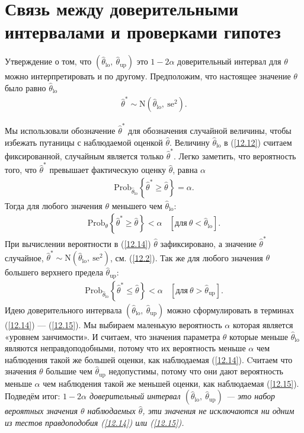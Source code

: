 \section{Связь между доверительными интервалами и проверками гипотез}
Утверждение о том, что $(\widehat{\theta}_{\text{lo}},\  \widehat{\theta}_{\text{up}})$ это $1 - 2 \alpha$ доверительный интервал для $\theta$ можно интерпретировать и по другому. Предположим, что настоящее значение $\theta$ было равно $\widehat{\theta}_{\text{lo}}$
\begin{gather}\label{12.12}
\widehat{\theta}^{*} \sim \mathrm{N}(\hat{\theta}_{\text{lo}}, \ \text{se}^{2}).
\end{gather}

Мы использовали обозначение $\widehat{\theta}^{*}$ для обозначения случайной величины, чтобы избежать путаницы с наблюдаемой оценкой $\widehat{\theta}$. Величину $\widehat{\theta}_{\text{lo}}$ в (\ref{12.12}) считаем фиксированной, случайным является только $\widehat{\theta}^{*}$. Легко заметить, что вероятность того, что $\widehat{\theta}^{*}$ превышает фактическую оценку $\widehat{\theta}$, равна $\alpha$
\begin{gather}\label{12.13}
\text{Prob}_{\widehat{\theta}_{\text{lo}}} \left\{ \widehat{\theta}^{*} \ge \widehat{\theta}  \right\} = \alpha.
\end{gather}
Тогда для любого значения $\theta$ меньшего чем $\widehat{\theta}_{\text{lo}}$:
\begin{gather}\label{12.14}
\text{Prob}_{\theta} \left\{\widehat{\theta}^{*} \ge \widehat{\theta}  \right\} < \alpha \ \ \ \ [\text{для} \  \theta < \widehat{\theta}_{\text{lo}}].
\end{gather}
При вычислении вероятности в (\ref{12.14}) $\widehat{\theta}$ зафиксировано, а значение $\widehat{\theta}^{*}$ случайное, $\widehat{\theta}^{*} \sim \mathrm{N}(\widehat{\theta}_{\text{lo}}, \ \text{se}^{2})$, см. (\ref{12.2}). Так же для любого значения $\theta$ большего верхнего предела $\widehat{\theta}_{\text{up}}$:
\begin{gather}\label{12.15}
\text{Prob}_{\widehat{\theta}_{\text{lo}}}\left\{\widehat{\theta}^{*} \le \widehat{\theta}  \right\} < \alpha \ \ \ \ [\text{для} \  \theta > \widehat{\theta}_{\text{up}}].
\end{gather}
Идею доверительного интервала $(\widehat{\theta}_{\text{lo}}, \ \widehat{\theta}_{\text{up}})$ можно сформулировать в терминах (\ref{12.14}) --- (\ref{12.15}). Мы выбираем маленькую вероятность $\alpha$ которая является «уровнем занчимости». И считаем, что значения параметра $\theta$ которые меньше $\widehat{\theta}_{\text{lo}}$ являются неправдоподобными, потому что их вероятность меньше $\alpha$ чем наблюдения такой же большей оценки, как  наблюдаемая (\ref{12.14}). Cчитаем что значения $\theta$ большие чем $ \widehat{\theta}_{\text{up}}$ недопустимы, потому что они дают вероятность меньше $\alpha$ чем наблюдения такой же меньшей оценки, как наблюдаемая (\ref{12.15}). Подведём итог: \textit{$1 - 2 \alpha$ доверительный интервал $(\widehat{\theta}_{\text{lo}}, \ \widehat{\theta}_{\text{up}})$ --- это набор вероятных значения $\theta$ наблюдаемых $\widehat{\theta}$, эти значения не исключаются ни одним из тестов правдоподобия (\ref{12.14}) или (\ref{12.15}).}
